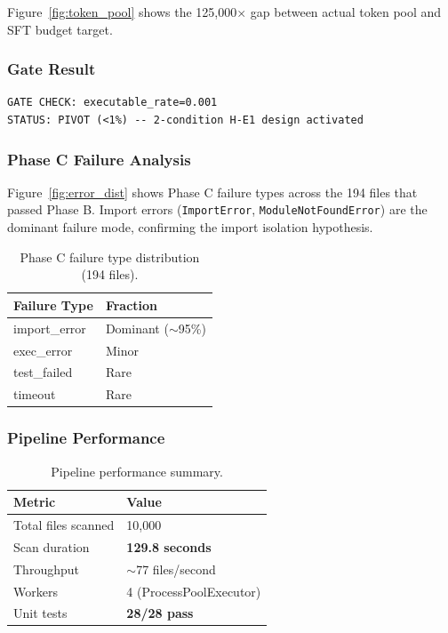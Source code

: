 Figure~\ref{fig:token_pool} shows the 125,000$\times$ gap between actual token pool
and SFT budget target.

\subsubsection{Gate Result}

\begin{verbatim}
GATE CHECK: executable_rate=0.001
STATUS: PIVOT (<1%) -- 2-condition H-E1 design activated
\end{verbatim}

\subsubsection{Phase C Failure Analysis}

Figure~\ref{fig:error_dist} shows Phase C failure types across the 194 files that passed
Phase B. Import errors (\texttt{ImportError}, \texttt{ModuleNotFoundError}) are the dominant
failure mode, confirming the import isolation hypothesis.

\begin{table}[h]
\centering
\caption{Phase C failure type distribution (194 files).}
\label{tab:errors}
\begin{tabular}{ll}
\toprule
\textbf{Failure Type} & \textbf{Fraction} \\
\midrule
import\_error & Dominant ($\sim$95\%) \\
exec\_error & Minor \\
test\_failed & Rare \\
timeout & Rare \\
\bottomrule
\end{tabular}
\end{table}

\subsubsection{Pipeline Performance}

\begin{table}[h]
\centering
\caption{Pipeline performance summary.}
\label{tab:perf}
\begin{tabular}{ll}
\toprule
\textbf{Metric} & \textbf{Value} \\
\midrule
Total files scanned & 10,000 \\
Scan duration & \textbf{129.8 seconds} \\
Throughput & $\sim$77 files/second \\
Workers & 4 (ProcessPoolExecutor) \\
Unit tests & \textbf{28/28 pass} \\
\bottomrule
\end{tabular}
\end{table}

